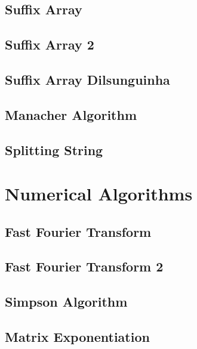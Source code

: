 \subsection{Suffix Array}
\raggedbottom
\hrulefill
\subsection{Suffix Array 2}
\raggedbottom
\hrulefill
\subsection{Suffix Array Dilsunguinha}
\raggedbottom
\hrulefill
\subsection{Manacher Algorithm}
\raggedbottom
\hrulefill
\subsection{Splitting String}
\raggedbottom
\hrulefill

\section{Numerical Algorithms}
\subsection{Fast Fourier Transform}
\raggedbottom
\hrulefill
\subsection{Fast Fourier Transform 2}
\raggedbottom
\hrulefill
\subsection{Simpson Algorithm}
\raggedbottom
\hrulefill
\subsection{Matrix Exponentiation}
\raggedbottom
\hrulefill

